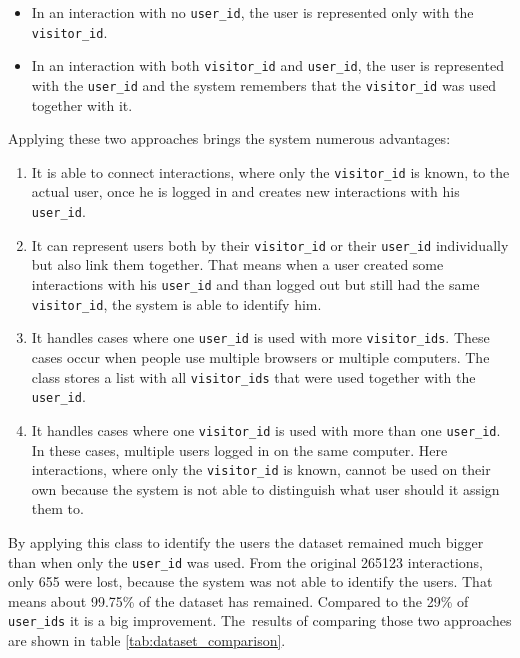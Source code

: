 \begin{itemize}
    \item In an interaction with no \texttt{user\_id}, the user is represented only with the \texttt{visitor\_id}.
    
    \item In an interaction with both \texttt{visitor\_id} and \texttt{user\_id}, the user is represented with the \texttt{user\_id} and the system remembers that the \texttt{visitor\_id} was used together with it. 
\end{itemize}
Applying these two approaches brings the system numerous advantages:

\begin{enumerate}
    \item It is able to connect interactions, where only the \texttt{visitor\_id} is known, to the actual user, once he is logged in and creates new interactions with his \texttt{user\_id}.

    \item It can represent users both by their \texttt{visitor\_id} or their \texttt{user\_id} individually but also link them together. That means when a user created some interactions with his \texttt{user\_id} and than logged out but still had the same \texttt{visitor\_id}, the system is able to identify him.

    \item It handles cases where one \texttt{user\_id} is used with more \texttt{visitor\_ids}. These cases occur when people use multiple browsers or multiple computers. The class stores a list with all \texttt{visitor\_ids} that were used together with the \texttt{user\_id}.

    \item It handles cases where one \texttt{visitor\_id} is used with more than one \texttt{user\_id}. In these cases, multiple users logged in on the same computer. Here interactions, where only the \texttt{visitor\_id} is known, cannot be used on their own because the system is not able to distinguish what user should it assign them to.
\end{enumerate}
By applying this class to identify the users the dataset remained much bigger than when only the \texttt{user\_id} was used. From the original 265123 interactions, only 655 were lost, because the system was not able to identify the users. That means about 99.75\% of the dataset has remained. Compared to the 29\% of \texttt{user\_ids} it is a big improvement. The~results of comparing those two approaches are shown in table \ref{tab:dataset_comparison}. \\ \\


